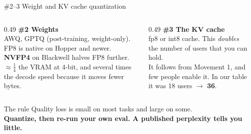 \documentclass[aspectratio=169,10pt]{beamer}
\newcommand{\emphc}[1]{\textcolor{accent}{\textbf{#1}}}
\newcommand{\llmbase}{%
  \node[llmbox] (PF) at (0, 0) {Prefill};
  \node[llmbox] (KV) at (1.05, 0) {KV};
  \node[llmbox] (DC) at (1.95, 0) {Decode};
  \node[llmbox] (WP) at (0, -0.45) {Weights};
  \node[llmbox] (WD) at (1.95, -0.45) {Weights};
  \draw[llmar] (PF)--(KV); \draw[llmar] (KV)--(DC);
  \draw[llmar] (WP)--(PF); \draw[llmar] (WD)--(DC);
}
\newcommand{\llmoverlay}[1]{}  %
\newcommand{\llmdiagWKV}{\llmoverlay{\begin{tikzpicture}[scale=0.65]\llmbase
  \node[llmbox, llmhl] at (0,-0.45) {Weights};
  \node[llmbox, llmhl] at (1.95,-0.45) {Weights};
  \node[llmbox, llmhl] at (1.05,0) {KV};\end{tikzpicture}}}
\begin{document}
\begin{frame}{\#2--3 Weight and KV cache quantization}
  \llmdiagWKV
  \begin{columns}[T]
    \begin{column}{0.49\textwidth}
      \textbf{\#2 Weights}\\[0.3em]
      \small
      AWQ, GPTQ (post-training, weight-only). FP8 is native on Hopper and
      newer. \emphc{NVFP4} on Blackwell halves FP8 further.\\[0.4em]
      $\approx \frac14$ the VRAM at 4-bit, and several times the decode speed
      because it moves fewer bytes.
    \end{column}
    \begin{column}{0.49\textwidth}
      \textbf{\#3 The KV cache}\\[0.3em]
      \small
      fp8 or int8 cache. This \emph{doubles} the number of users that you can
      hold.\\[0.4em]
      It follows from Movement 1, and few people enable it.
      In our table it was 18 users $\rightarrow$ \emphc{36}.
    \end{column}
  \end{columns}
  \vspace{1.2em}
  \begin{center}
    \begin{minipage}{0.88\textwidth}
      \begin{alertblock}{The rule}
        \centering
        Quality loss is small on most tasks and large on some.\\
        \textbf{Quantize, then re-run your own eval. A published perplexity
        tells you little.}
      \end{alertblock}
    \end{minipage}
  \end{center}
\end{frame}
\end{document}
